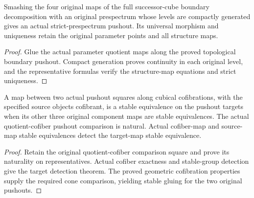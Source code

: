 \begin{proposition}
  \label{prop:actual-full-cube-boundary-smash-pushout}
  \leanok
  Smashing the four original maps of the full successor-cube boundary decomposition with an original prespectrum whose levels are compactly generated gives an actual strict-prespectrum pushout. Its universal morphism and uniqueness retain the original parameter points and all structure maps.
\end{proposition}
\begin{proof}
  Glue the actual parameter quotient maps along the proved topological boundary pushout. Compact generation proves continuity in each original level, and the representative formulas verify the structure-map equations and strict uniqueness.
  \leanok
\end{proof}

\begin{proposition}
  \label{prop:actual-cubical-stable-gluing}
  \leanok
  A map between two actual pushout squares along cubical cofibrations, with the specified source objects cofibrant, is a stable equivalence on the pushout targets when its other three original component maps are stable equivalences. The actual quotient-cofiber pushout comparison is natural. Actual cofiber-map and source-map stable equivalences detect the target-map stable equivalence.
\end{proposition}
\begin{proof}
  Retain the original quotient-cofiber comparison square and prove its naturality on representatives. Actual cofiber exactness and stable-group detection give the target detection theorem. The proved geometric cofibration properties supply the required cone comparison, yielding stable gluing for the two original pushouts.
  \leanok
\end{proof}

